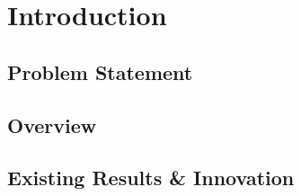 \chapter{Introduction}\label{ch:introduction}


\section{Problem Statement}


\section{Overview}


\section {Existing Results \& Innovation}\label{sec:existing_results_innovation}

